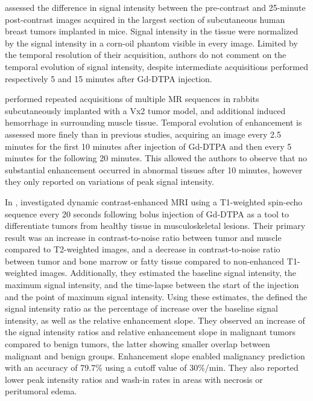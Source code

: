 \citet{Revel:1986ix} assessed the difference in signal intensity between the pre-contrast and 25-minute post-contrast images acquired in the largest section of subcutaneous human breast tumors implanted in mice.
Signal intensity in the tissue were normalized by the signal intensity in a corn-oil phantom visible in every image. 
Limited by the temporal resolution of their acquisition, authors do not comment on the temporal evolution of signal intensity, despite intermediate acquisitions performed respectively 5 and 15 minutes after Gd-DTPA injection. %

\citet{Pettersson:1987ft} performed repeated acquisitions of multiple MR sequences in rabbits subcutaneously implanted with a Vx2 tumor model, and additional induced hemorrhage in surrounding muscle tissue. 
Temporal evolution of enhancement is assessed more finely than in previous studies, acquiring an image every 2.5 minutes for the first 10 minutes after injection of Gd-DTPA and then every 5 minutes for the following 20 minutes.
This allowed the authors to observe that no substantial enhancement occurred in abnormal tissues after 10 minutes, however they only reported on variations of peak signal intensity. %

In \citeyear{Erlemann:1989ib}, \citet{Erlemann:1989ib} investigated dynamic contrast-enhanced MRI using a T1-weighted spin-echo sequence every 20 seconds following bolus injection of Gd-DTPA as a tool to differentiate tumors from healthy tissue in musculoskeletal lesions.
Their primary result was an increase in contrast-to-noise ratio between tumor and muscle compared to T2-weighted images, and a decrease in contrast-to-noise ratio between tumor and bone marrow or fatty tissue compared to non-enhanced T1-weighted images. 
Additionally, they estimated the baseline signal intensity, the maximum signal intensity, and the time-lapse between the start of the injection and the point of maximum signal intensity. 
Using these estimates, the defined the signal intensity ratio as the percentage of increase over the baseline signal intensity, as well as the relative enhancement slope.
They observed an increase of the signal intensity ratios and relative enhancement slope in malignant tumors compared to benign tumors, the latter showing smaller overlap between malignant and benign groups.
Enhancement slope enabled malignancy prediction with an accuracy of 79.7\% using a cutoff value of 30\%/min.
They also reported lower peak intensity ratios and wash-in rates in areas with necrosis or peritumoral edema. %

